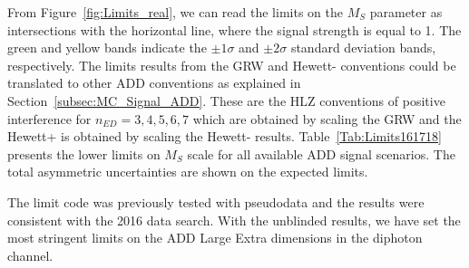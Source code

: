 From Figure~\ref{fig:Limits_real}, we can read the limits on the $M_S$ parameter as intersections with the horizontal line, where the signal strength is equal to 1. The green and yellow bands indicate the $\pm1\sigma$ and $\pm2\sigma$ standard deviation bands, respectively. The limits results from the GRW and Hewett- conventions could be translated to other ADD conventions as explained in Section~\ref{subsec:MC_Signal_ADD}. These are the HLZ conventions of positive interference for $n_{ED}=3,4,5,6,7$ which are obtained by scaling the GRW and the Hewett+ is obtained by scaling the Hewett- results. Table~\ref{Tab:Limits161718} presents the lower limits on $M_S$ scale for all available ADD signal scenarios. The total asymmetric uncertainties are shown on the expected limits.
\begin{table}[pt]
    \centering
    \caption{Exclusion limits on the mass scale \Ms (in units of {\TeVns}) for various conventions used in the calculation of the ADD large extra-dimensional scenario using the 2016-2018 CMS detector data corresponding to an integrated luminosity of 138 \fbinv.}
    \label{Tab:Limits161718}
\end{table}
The limit code was previously tested with pseudodata and the results were consistent with the 2016 data search. With the unblinded results, we have set the most stringent limits on the ADD Large Extra dimensions in the diphoton channel.

